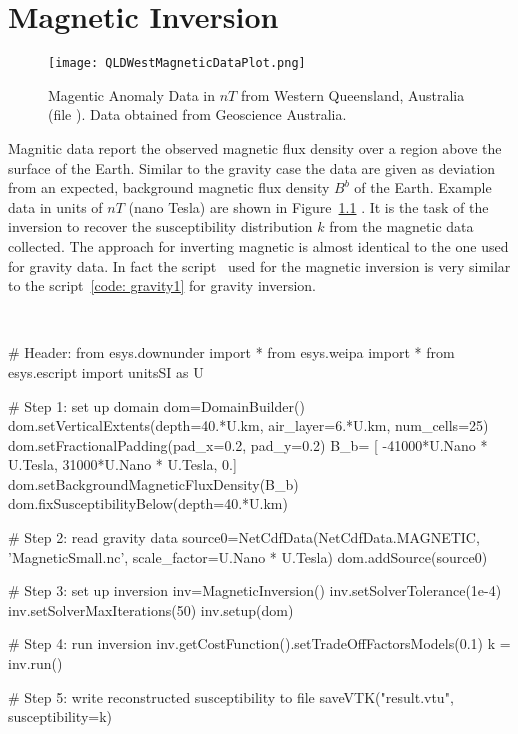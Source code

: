 \chapter{Magnetic Inversion}\label{Chp:cook:magnetic inversion}


\begin{figure}
\centering
\texttt{[image: QLDWestMagneticDataPlot.png]}
\caption{Magentic Anomaly Data in $nT$ from Western Queensland, Australia
    (file ). Data obtained from Geoscience Australia.}
\label{FIG:P1:MAG:0}
\end{figure}

Magnitic data report the observed magnetic flux density over a region above the surface of the Earth. 
Similar to the gravity case the data are given as deviation from an expected, background magnetic flux density $B^b$
of the Earth. Example data in units of $nT$ (nano Tesla) are shown in Figure~\ref{FIG:P1:MAG:0} .
It is the task of the inversion to recover the susceptibility distribution $k$ from the magnetic
data collected. The approach for inverting magnetic is almost identical to the one used for gravity data. 
In fact the \downunder script~ used for the magnetic inversion is very similar to the 
script~\ref{code: gravity1} for gravity inversion.   


\begin{pyc}\label{code: magnetic1}
\
\begin{python}
# Header:
from esys.downunder import *
from esys.weipa import *
from esys.escript import unitsSI as U


# Step 1: set up domain
dom=DomainBuilder()
dom.setVerticalExtents(depth=40.*U.km, air_layer=6.*U.km, num_cells=25)
dom.setFractionalPadding(pad_x=0.2, pad_y=0.2)
B_b= [ -41000*U.Nano * U.Tesla, 31000*U.Nano * U.Tesla, 0.]
dom.setBackgroundMagneticFluxDensity(B_b)
dom.fixSusceptibilityBelow(depth=40.*U.km)

# Step 2: read gravity data
source0=NetCdfData(NetCdfData.MAGNETIC, 'MagneticSmall.nc', scale_factor=U.Nano * U.Tesla)
dom.addSource(source0)

# Step 3: set up inversion
inv=MagneticInversion()
inv.setSolverTolerance(1e-4)
inv.setSolverMaxIterations(50)
inv.setup(dom)

# Step 4: run inversion 
inv.getCostFunction().setTradeOffFactorsModels(0.1) 
k = inv.run()

# Step 5: write reconstructed susceptibility to file
saveVTK("result.vtu", susceptibility=k)
\end{python}
\end{pyc}

